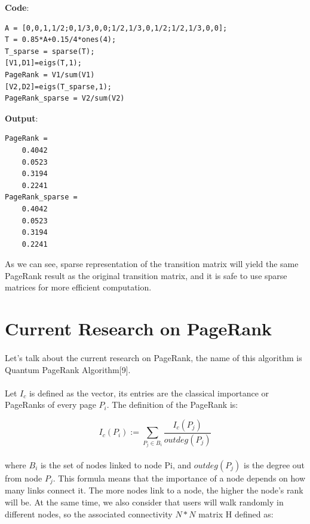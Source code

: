 \documentclass[12pt]{article}
\begin{document}
\noindent\textbf{Code}:
\begin{verbatim}
A = [0,0,1,1/2;0,1/3,0,0;1/2,1/3,0,1/2;1/2,1/3,0,0];
T = 0.85*A+0.15/4*ones(4);
T_sparse = sparse(T);
[V1,D1]=eigs(T,1);
PageRank = V1/sum(V1)
[V2,D2]=eigs(T_sparse,1);
PageRank_sparse = V2/sum(V2)
\end{verbatim}

\noindent\textbf{Output}:
\begin{verbatim}
PageRank =
    0.4042
    0.0523
    0.3194
    0.2241
PageRank_sparse =
    0.4042
    0.0523
    0.3194
    0.2241
\end{verbatim}

\noindent As we can see, sparse representation of the transition matrix will yield the same PageRank result as the original transition matrix, and it is safe to use sparse matrices for more efficient computation.\\


\section{Current Research on PageRank}
\paragraph{} Let's talk about the current research on PageRank, the name of this algorithm is Quantum PageRank Algorithm[9].
\paragraph{} Let $I_c$ is defined as the vector, its entries are the classical importance or PageRanks of every page $P_i$. The definition of the PageRank is:

\begin{equation*}
  I_c(P_i) := \sum_{P_j \in B_i} \frac{I_c(P_j)}{outdeg(P_j)}
\end{equation*}

\paragraph{} where $B_i$ is the set of nodes linked to node Pi, and $outdeg(P_j)$ is the degree out from node $P_j$. This formula means that the importance of a node depends on how many links connect it. The more nodes link to a node, the higher the node's rank will be. At the same time, we also consider that users will walk randomly in different nodes, so the associated connectivity $N*N$ matrix H defined as:
\end{document}
